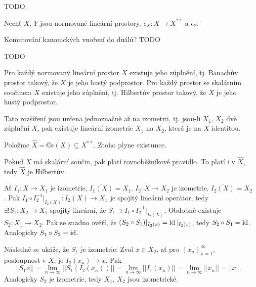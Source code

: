 \documentclass[12pt]{article}					%
\begin{document}
\begin{dusledek}
	TODO.
\end{dusledek}

\begin{tvrzeni}[J. P. Schauder, 1930]
	Nechť $X$, $Y$ jsou normované lineární prostory, $\epsilon_X: X \rightarrow X^{**}$ a $\epsilon_Y: $
\end{tvrzeni}


\begin{tvrzeni}
	Komutování kanonických vnoření do duálů? TODO

	\begin{dukazin}
		TODO
	\end{dukazin}
\end{tvrzeni}

\begin{veta}
	Pro každý normovaný lineární prostor $X$ existuje jeho zúplnění, tj. Banachův prostor takový, že $X$ je jeho hustý podprostor. Pro každý prostor se skalárním součinem $X$ existuje jeho zúplnění, tj. Hilbertův prostor takový, že $X$ je jeho hustý podprostor.

	Tato rozšíření jsou určena jednoznačně až na izometrii, tj. jsou-li $X_1$, $X_2$ dvě zúplnění $X$, pak existuje lineární izometrie $X_1$ na $X_2$, která je na $X$ identitou.

	\begin{dukazin}
		Položme $\hat{X} = \overline{©\epsilon(X)} \subseteq X^{**}$. Ztoho plyne existunce.

		Pokud $X$ má skalární součin, pak platí rovnoběžníkové pravidlo. To platí i v $\hat{X}$, tedy $\hat{X}$ je Hilbertův.

		Ať $I_1: X \rightarrow X_1$ je izometrie, $\overline{I_1(X)} = X_1$, $I_2: X \rightarrow X_2$ je izometrie, $\overline{I_2(X)} = X_2$. Pak $I_1 \circ I_2^{-1}|_{I_2(X)}: I_2(X) \rightarrow X_1$ je spojitý lineární operátor, tedy $\exists! S_1: X_2 \rightarrow X_1$ spojitý lineární, že $S_1 \supset I_1 \circ I_2^{-1}|_{I_2(X)}$. Obdobně existuje $S_2: X_1 \rightarrow X_2$. Pak se snadno ověří, že $(S_2 \circ S_1)|_{I_2(x)} = \operatorname{id}|_{I_2(x)}$, tedy $S_2 \circ S_1 = \operatorname{id}$. Analogicky $S_1 \circ S_2 = \operatorname{id}$.

		Následně se ukáže, že $S_1$ je izometrie: Zvol $x \in X_2$, ať pro $(x_n)_{n=1}^∞$, posloupnost v $X$, je $I_2(x_n) \rightarrow x$. Pak
		$$ ||S_1 x|| = \lim_{n \rightarrow ∞}||S_1(I_2(x_n))|| = \lim_{n \rightarrow ∞} ||I_1(x_n)|| = \lim_{n \rightarrow ∞}||x_n|| = ||x||. $$
		Analogicky $S_2$ je izometrie, tedy $X_1$, $X_2$ jsou izometrické.
	\end{dukazin}

\end{veta}
	
\end{document}
